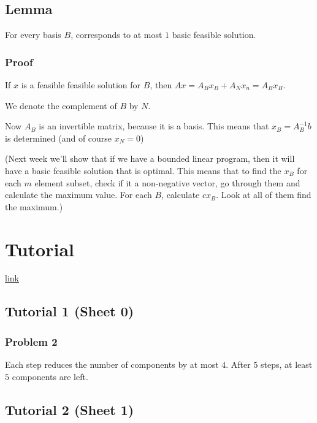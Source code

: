 \documentclass[11pt]{article}
\begin{document}
\subsection{Lemma}
\label{sec:org0c1b462}
For every basis \(B\), corresponds to at most \(1\) basic feasible solution.
\subsubsection{Proof}
\label{sec:orgf0a2021}
If \(x\) is a feasible feasible solution for \(B\), then \(Ax = A_Bx_B + A_N
    x_n = A_B x_B\).

We denote the complement of \(B\) by \(N\).

Now \(A_B\) is an invertible matrix, because it is a basis. This means that
\(x_B = A_B^{-1} b\) is determined (and of course \(x_N = 0\))

(Next week we'll show that if we have a bounded linear program, then it will
have a basic feasible solution that is optimal. This means that to find the
\(x_B\) for each \(m\) element subset, check if it a non-negative vector, go
through them and calculate the maximum value. For each \(B\), calculate \(c
    x_B\). Look at all of them find the maximum.)    
\section{Tutorial}
\label{sec:org99aea2f}
\href{http://discretemath.imp.fu-berlin.de/DMII-2018-19/}{link}
\subsection{Tutorial 1 (Sheet 0)}
\label{sec:org12c9d89}
\subsubsection{Problem 2}
\label{sec:org45aac0d}
Each step reduces the number of components by at most \(4\). After \(5\) steps, at least \(5\) components are left. 
\subsection{Tutorial 2 (Sheet 1)}
\label{sec:orgd43f351}
\end{document}
